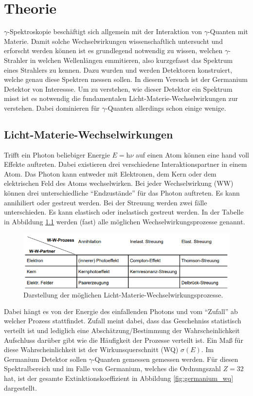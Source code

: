 \chapter{Theorie}
\label{cha:Theorie}
$\gamma$-Spektroskopie beschäftigt sich allgemein mit der Interaktion von $\gamma$-Quanten mit Materie. Damit solche Wechselwirkungen wissenschaftlich untersucht und erforscht werden
können ist es grundlegend notwendig zu wissen, welchen $\gamma$-Strahler in welchen Wellenlängen emmitieren, also kurzgefasst das Spektrum eines Strahlers zu kennen. Dazu wurden 
und werden Detektoren konstruiert, welche genau diese Spektren messen sollen. In diesem Versuch ist der Germanium Detektor von Interessse. Um zu verstehen, wie dieser Detektor 
ein Spektrum misst ist es notwendig die fundamentalen Licht-Materie-Wechselwirkungen zur verstehen. Dabei dominieren für $\gamma$-Quanten allerdings schon einige wenige.

\section{Licht-Materie-Wechselwirkungen}
\label{sec:WW}
Trifft ein Photon beliebiger Energie $E = \mathrm{h}\nu$ auf einen Atom können eine hand voll Effekte auftreten. Dabei existieren drei verschiedene Interaktionspartner in einem Atom. 
Das Photon kann entweder mit Elektronen, dem Kern oder dem elektrischen Feld des Atoms wechselwirken. Bei jeder Wechselwirkung (WW) können drei unterschiedliche \enquote{Endzustände}
für das Photon auftreten. Es kann annihiliert oder gestreut werden. Bei der Streuung werden zwei fälle unterschieden. Es kann elastisch oder inelastisch gestreut werden. 
In der Tabelle in Abbildung \ref{fig:WW_photon} werden (fast) alle möglichen Wechselwirkungsprozesse genannt.

\begin{figure}
    \centering
    \includegraphics[width = \textwidth]{content/pics/tabelleGamma.png}
    \caption{Darstellung der möglichen Licht-Materie-Wechselwirkungsprozesse.}
    \label{fig:WW_photon}
\end{figure}

Dabei hängt es von der Energie des einfallenden Photons und vom \enquote{Zufall} ab welcher Prozess stattfindet. Zufall meint dabei, dass das Geschehniss statistisch verteilt ist und 
lediglich eine Abschätzung/Bestimmung der Wahrscheinlichkeit Aufschluss darüber gibt wie die Häufigkeit der Prozesse verteilt ist. Ein Maß für diese Wahrscheinlichkeit ist der
Wirkunsquerschnitt (WQ) $\sigma(E)$. Im Germanium Detektor sollen $\gamma$-Quanten gemessen gemessen werden. Für diesen Spektralbereich und im Falle von Germanium, welches die Ordnungszahl
$Z = 32$ hat, ist der gesamte Extinktionskoeffizient in Abbildung \ref{fig:germanium_wq} dargestellt. 

